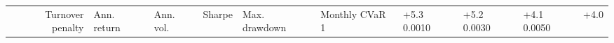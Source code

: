 \begin{tabular}{rlllllll}
\toprule
Turnover penalty & Ann. return & Ann. vol. & Sharpe & Max. drawdown & Monthly CVaR 1%
 & +5.3%
0.0010 & +5.2%
0.0030 & +4.1%
0.0050 & +4.0%
\bottomrule
\end{tabular}
